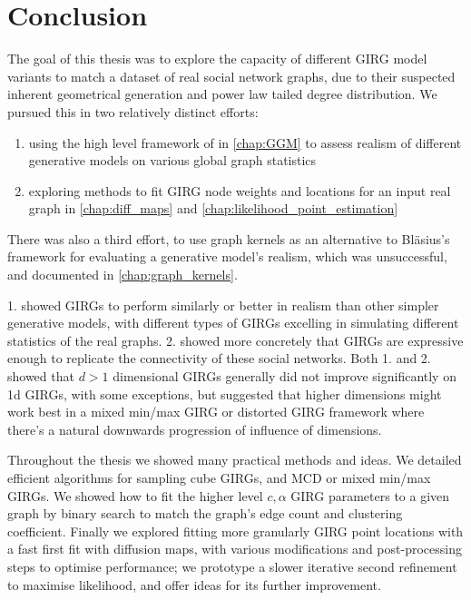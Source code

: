 \chapter{Conclusion}
The goal of this thesis was to explore the capacity of different GIRG model variants to match a dataset of real social network graphs, due to their suspected inherent geometrical generation and power law tailed degree distribution. We pursued this in two relatively distinct efforts:
\begin{enumerate}
    \item using the high level framework of \cite{blasius2018towards} in \cref{chap:GGM} to assess realism of different generative models on various global graph statistics
    \item exploring methods to fit GIRG node weights and locations for an input real graph in \cref{chap:diff_maps} and \cref{chap:likelihood_point_estimation}
\end{enumerate}
There was also a third effort, to use graph kernels as an alternative to Bl{\"a}sius's framework for evaluating a generative model's realism, which was unsuccessful, and documented in \cref{chap:graph_kernels}.

1. showed GIRGs to perform similarly or better in realism than other simpler generative models, with different types of GIRGs excelling in simulating different  statistics of the real graphs. 2. showed more concretely that GIRGs are expressive enough to replicate the connectivity of these social networks. Both 1. and 2. showed that $d > 1$ dimensional GIRGs generally did not improve significantly on 1d GIRGs, with some exceptions, but suggested that higher dimensions might work best in a mixed min/max GIRG or distorted GIRG framework where there's a natural downwards progression of influence of dimensions.

Throughout the thesis we showed many practical methods and ideas. We detailed efficient algorithms for sampling cube GIRGs, and MCD or mixed min/max GIRGs. We showed how to fit the higher level $c, \alpha$ GIRG parameters to a given graph by binary search to match the graph's edge count and clustering coefficient. Finally we explored fitting more granularly GIRG point locations with a fast first fit with diffusion maps, with various modifications and post-processing steps to optimise performance; we prototype a slower iterative second refinement to maximise likelihood, and offer ideas for its further improvement. 



